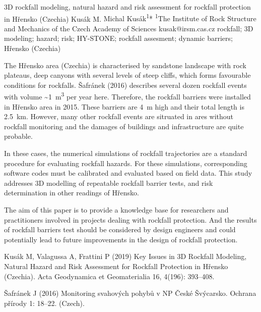 \abstract
{3D rockfall modeling, natural hazard and risk assessment for rockfall protection in Hřensko (Czechia)} 
{Kusák M.} 
{Michal Kusák\textsuperscript{1}*} 
{\POtag} 
{
\textsuperscript{1}The Institute of Rock Structure and Mechanics of the Czech Academy of Sciences
}
{kusak@irsm.cas.cz}  %
{rockfall; 3D modeling; hazard; risk; HY-STONE; rockfall assesment; dynamic barriers; Hřensko (Czechia)}
{The Hřensko area (Czechia) is characterised by sandstone landscape with rock plateaus, deep canyons with several levels of steep cliffs, which forms favourable conditions for rockfalls. Šafránek (2016) describes several dozen rockfall events with volume \textasciitilde1~m\textsuperscript{3} per year here. Therefore, the rockfall barriers were installed in Hřensko area in 2015. These barriers are 4~m high and their total length is 2.5~km. However, many other rockfall events are sitruated in ares without rockfall monitoring and the damages of buildings and infrastructure are quite probable. 

In these cases, the numerical simulations of rockfall trajectories are a standard procedure for evaluating rockfall hazards. For these simulations, corresponding software codes must be calibrated and evaluated based on field data. This study addresses 3D modelling of repeatable rockfall barrier tests, and risk determination in other readings of Hřensko.

The aim of this paper is to provide a knowledge base for researchers and practitioners involved in projects dealing with rockfall protection. And the results of rockfall barriers test should be considered by design engineers and could potentially lead to future improvements in the design of rockfall protection.
}
{Kusák M, Valagussa A, Frattini P (2019) Key Issues in 3D Rockfall Modeling, Natural Hazard and Risk Assessment for Rockfall Protection in Hřensko (Czechia). Acta Geodynamica et Geomaterialia 16, 4(196): 393–408.

Šafránek J (2016) Monitoring svahových pohybů v NP České Švýcarsko. Ochrana přírody 1: 18–22. (Czech).
}

